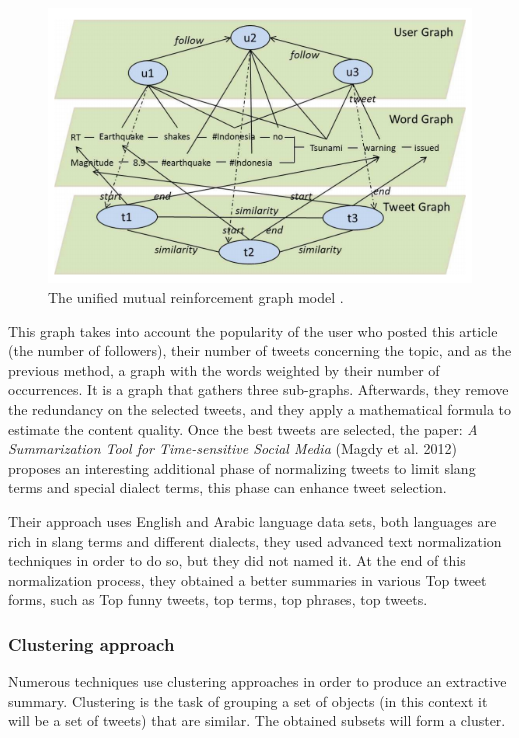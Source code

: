 \documentclass[runningheads]{llncs}
\begin{document}
\begin{figure}[H]
    \includegraphics[width=\textwidth]{fig3.png}
    \caption{The unified mutual reinforcement graph model \cite{duan_twitter_2012}.}
    \label{fig:fig3}
\end{figure}

This graph takes into account the popularity of the user who posted this
article (the number of followers), their number of tweets concerning the topic,
and as the previous method, a graph with the words weighted by their number of
occurrences. It is a graph that gathers three sub-graphs. Afterwards, they
remove the redundancy on the selected tweets, and they apply a mathematical
formula to estimate the content quality. Once the best tweets are selected, the
paper: \textit{A Summarization Tool for Time-sensitive Social Media} (Magdy et
al. 2012)\cite{magdy_summarization_2012} proposes an interesting additional
phase of normalizing tweets to limit slang terms and special dialect terms,
this phase can enhance tweet selection.

Their approach uses English and Arabic language data sets, both languages are
rich in slang terms and different dialects, they used advanced text
normalization techniques in order to do so, but they did not named it. At the
end of this normalization process, they obtained a better summaries in various
Top tweet forms, such as Top funny tweets, top terms, top phrases, top tweets.

\subsubsection{Clustering approach}

Numerous techniques use clustering approaches in order to
produce an extractive summary. Clustering is the task of grouping a set of
objects (in this context it will be a set of tweets) that are similar. The
obtained subsets will form a cluster.
\end{document}
